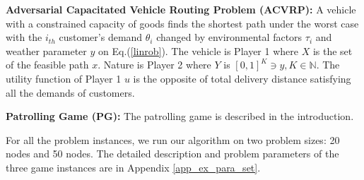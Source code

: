 \textbf{Adversarial Capacitated Vehicle Routing Problem (ACVRP):} A vehicle with a constrained capacity of goods finds the shortest path under the worst case with the $i_{th}$ customer's demand $\theta_i$ changed by environmental factors $\tau_i$ and weather parameter $y$ on Eq.(\ref{linrob}). The vehicle is Player 1 where $X$ is the set of the feasible path $x$. Nature is Player 2 where $Y$ is $[0, 1]^K \ni y, K \in \mathbb{N}$. The utility function of Player 1  $u$ is the opposite of total delivery distance satisfying all the demands of customers.


\textbf{Patrolling Game (PG):} The patrolling game is described in the introduction.

For all the problem instances, we run our algorithm on two problem sizes: 20 nodes and 50 nodes. The detailed description and problem parameters of the three game instances are in Appendix \ref{app_ex_para_set}.




